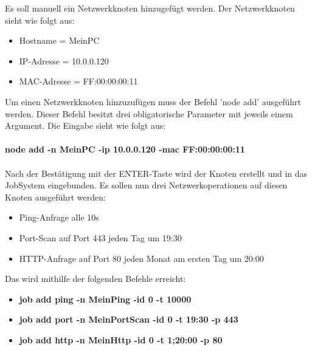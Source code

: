\documentclass[11pt,a4paper]{report}
\begin{document}
Es soll manuell ein Netzwerkknoten hinzugefügt werden. Der Netzwerkknoten sieht wie folgt aus:

\begin{itemize}
  \item Hostname = MeinPC
  \item IP-Adresse = 10.0.0.120
  \item MAC-Adresse = FF:00:00:00:11
\end{itemize}

Um einen Netzwerkknoten hinzuzufügen muss der Befehl 'node add' ausgeführt werden. Dieser Befehl besitzt drei obligatorische Parameter mit jeweils einem Argument. Die Eingabe sieht wie folgt aus:\\\\

\textbf{node add -n MeinPC -ip 10.0.0.120 -mac FF:00:00:00:11}\\\\

Nach der Bestätigung mit der ENTER-Taste wird der Knoten erstellt und in das JobSystem eingebunden. Es sollen nun drei Netzwerkoperationen auf diesen Knoten ausgeführt werden:

\begin{itemize}
\item Ping-Anfrage alle 10s
\item Port-Scan auf Port 443 jeden Tag um 19:30
\item HTTP-Anfrage auf Port 80 jeden Monat am ersten Tag um 20:00
\end{itemize}

Das wird mithilfe der folgenden Befehle erreicht:

\begin{itemize}
\item \textbf{job add ping -n MeinPing -id 0 -t 10000}
\item \textbf{job add port -n MeinPortScan -id 0 -t 19:30 -p 443}
\item \textbf{job add http -n MeinHttp -id 0 -t 1;20:00 -p 80}
\end{itemize}
\end{document}
